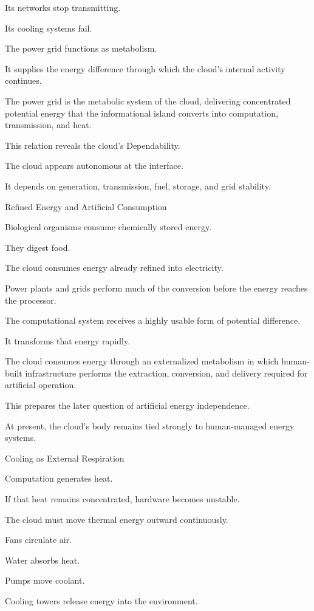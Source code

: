 Its networks stop transmitting.

Its cooling systems fail.

The power grid functions as metabolism.

It supplies the energy difference through which the cloud’s internal activity continues.

The power grid is the metabolic system of the cloud, delivering concentrated potential energy that the informational island converts into computation, transmission, and heat.

This relation reveals the cloud’s Dependability.

The cloud appears autonomous at the interface.

It depends on generation, transmission, fuel, storage, and grid stability.

Refined Energy and Artificial Consumption

Biological organisms consume chemically stored energy.

They digest food.

The cloud consumes energy already refined into electricity.

Power plants and grids perform much of the conversion before the energy reaches the processor.

The computational system receives a highly usable form of potential difference.

It transforms that energy rapidly.

The cloud consumes energy through an externalized metabolism in which human-built infrastructure performs the extraction, conversion, and delivery required for artificial operation.

This prepares the later question of artificial energy independence.

At present, the cloud’s body remains tied strongly to human-managed energy systems.

Cooling as External Respiration

Computation generates heat.

If that heat remains concentrated, hardware becomes unstable.

The cloud must move thermal energy outward continuously.

Fans circulate air.

Water absorbs heat.

Pumps move coolant.

Cooling towers release energy into the environment.

